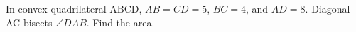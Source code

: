In convex quadrilateral ABCD, $AB=CD=5$, $BC=4$, and $AD=8$. Diagonal AC bisects $\angle DAB$. Find the area.
